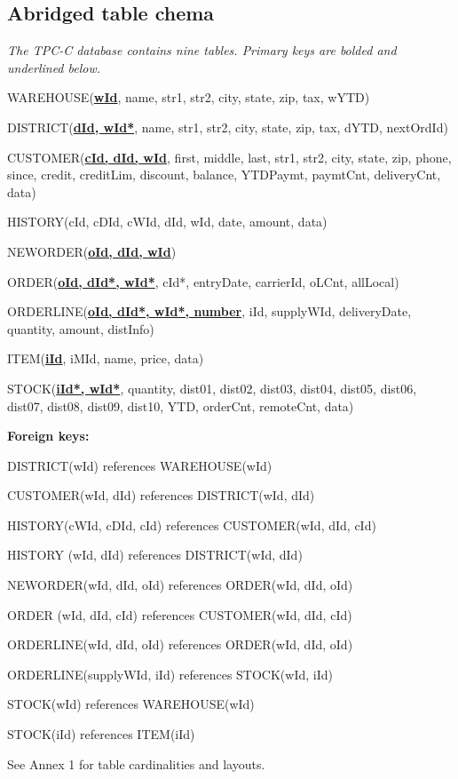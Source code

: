 \subsection{Abridged table chema}
\textit{The TPC-C database contains nine tables. Primary keys are bolded and underlined below.}

WAREHOUSE(\underline{\textbf{wId}}, name, str1, str2, city, state, zip, tax, wYTD)

DISTRICT(\underline{\textbf{dId, wId*}}, name, str1, str2, city, state, zip, tax,  dYTD, nextOrdId)

CUSTOMER(\underline{\textbf{cId, dId, wId}}, first, middle, last, str1, str2, city, state, zip, phone, since, credit, creditLim, discount, balance, YTDPaymt, paymtCnt, deliveryCnt, data)

HISTORY(cId, cDId, cWId, dId, wId, date, amount, data)

NEWORDER(\underline{\textbf{oId, dId, wId}})

ORDER(\underline{\textbf{oId, dId*, wId*}}, cId*, entryDate, carrierId, oLCnt, allLocal)

ORDERLINE(\underline{\textbf{oId, dId*, wId*, number}}, iId, supplyWId, deliveryDate, quantity, amount, distInfo)

ITEM(\underline{\textbf{iId}}, iMId, name, price, data)

STOCK(\underline{\textbf{iId*, wId*}}, quantity, dist01, dist02, dist03, dist04, dist05, dist06, dist07, dist08, dist09, dist10, YTD, orderCnt, remoteCnt, data)



\textbf{Foreign keys:}

DISTRICT(wId) references  WAREHOUSE(wId)

CUSTOMER(wId, dId) references DISTRICT(wId, dId)

HISTORY(cWId, cDId, cId) references CUSTOMER(wId, dId, cId)

HISTORY (wId, dId) references DISTRICT(wId, dId) 

NEWORDER(wId, dId, oId) references ORDER(wId, dId, oId)

ORDER (wId, dId, cId)  references CUSTOMER(wId, dId, cId)

ORDERLINE(wId, dId, oId) references ORDER(wId, dId, oId)

ORDERLINE(supplyWId, iId) references STOCK(wId, iId)

STOCK(wId) references WAREHOUSE(wId) 

STOCK(iId) references ITEM(iId)


See Annex 1 for table cardinalities and layouts.